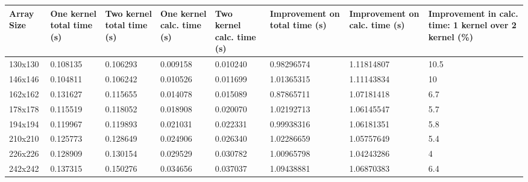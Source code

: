\documentclass[11pt, twocolumn]{article}
\begin{document}
    \begin{center}
        \begin{tabular}{ | p{1.3cm} | p{1.5cm} | p{1.5cm} | p{1.6cm} | p{1.6cm} | p{2cm} | p{1.9cm} | p{2cm} | }
            \hline
            Array Size  & One kernel total time (s) & Two kernel total time (s) & One kernel calc. time (s) & Two kernel calc. time (s) & Improvement on total time (s) & Improvement on calc. time (s) & Improvement in calc. time: 1 kernel over 2 kernel (\%) \\ \hline
            130x130 & 0.108135    & 0.106293    & 0.009158    & 0.010240    & 0.98296574  & 1.11814807  & 10.5  \\
            146x146 & 0.104811    & 0.106242    & 0.010526    & 0.011699    & 1.01365315  & 1.11143834  & 10    \\
            162x162 & 0.131627    & 0.115655    & 0.014078    & 0.015089    & 0.87865711  & 1.07181418  & 6.7   \\
            178x178 & 0.115519    & 0.118052    & 0.018908    & 0.020070    & 1.02192713  & 1.06145547  & 5.7   \\
            194x194 & 0.119967    & 0.119893    & 0.021031    & 0.022331    & 0.99938316  & 1.06181351  & 5.8   \\
            210x210 & 0.125773    & 0.128649    & 0.024906    & 0.026340    & 1.02286659  & 1.05757649  & 5.4   \\
            226x226 & 0.128909    & 0.130154    & 0.029529    & 0.030782    & 1.00965798  & 1.04243286  & 4     \\
            242x242 & 0.137315    & 0.150276    & 0.034656    & 0.037037    & 1.09438881  & 1.06870383  & 6.4   \\
            \hline
        \end{tabular}
    \end{center}
    \clearpage
\end{document}
